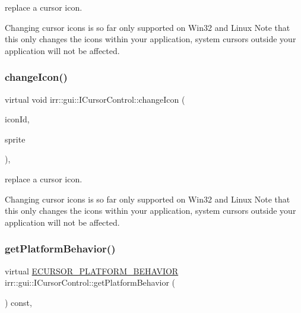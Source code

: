 replace a cursor icon. 

Changing cursor icons is so far only supported on Win32 and Linux Note that this only changes the icons within your application, system cursors outside your application will not be affected. \mbox{\label{classirr_1_1gui_1_1ICursorControl_a3e7c8cb1f03e1ccc31fcc3c30f717762}} 
\subsubsection{\texorpdfstring{change\+Icon()}{changeIcon()}\hspace{0.1cm}{\footnotesize\ttfamily [2/2]}}
{\footnotesize\ttfamily virtual void irr\+::gui\+::\+I\+Cursor\+Control\+::change\+Icon (\begin{DoxyParamCaption}\item[{\hyperlink{namespaceirr_1_1gui_aefee802dd632c5735703e40ef40f879b}{E\+C\+U\+R\+S\+O\+R\+\_\+\+I\+C\+ON}}]{icon\+Id,  }\item[{const \hyperlink{structirr_1_1gui_1_1SCursorSprite}{gui\+::\+S\+Cursor\+Sprite} \&}]{sprite }\end{DoxyParamCaption})\hspace{0.3cm}{\ttfamily [inline]}, {\ttfamily [virtual]}}



replace a cursor icon. 

Changing cursor icons is so far only supported on Win32 and Linux Note that this only changes the icons within your application, system cursors outside your application will not be affected. \mbox{\label{classirr_1_1gui_1_1ICursorControl_aad19b5b02de0b8bc476c66b152b745c4}} 
\subsubsection{\texorpdfstring{get\+Platform\+Behavior()}{getPlatformBehavior()}\hspace{0.1cm}{\footnotesize\ttfamily [1/2]}}
{\footnotesize\ttfamily virtual \hyperlink{namespaceirr_1_1gui_abbd186f9cfba2f805d98248df226acef}{E\+C\+U\+R\+S\+O\+R\+\_\+\+P\+L\+A\+T\+F\+O\+R\+M\+\_\+\+B\+E\+H\+A\+V\+I\+OR} irr\+::gui\+::\+I\+Cursor\+Control\+::get\+Platform\+Behavior (\begin{DoxyParamCaption}{ }\end{DoxyParamCaption}) const\hspace{0.3cm}{\ttfamily [inline]}, {\ttfamily [virtual]}}



